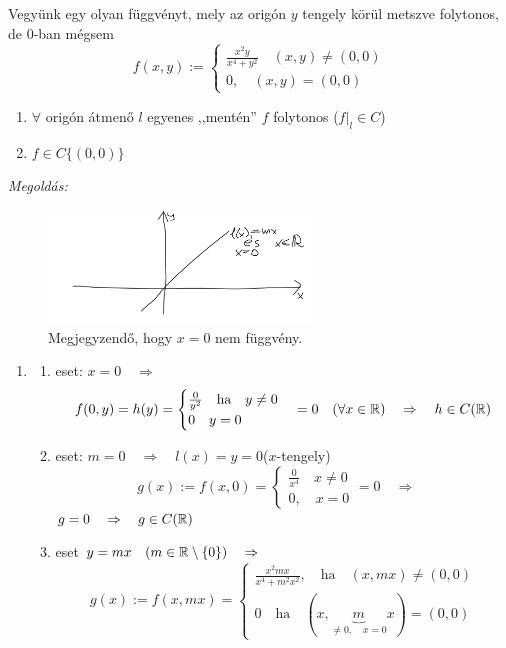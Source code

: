\documentclass[a4paper,11.5pt]{article}
\begin{document}
	\begin{task}
		Vegyünk egy olyan függvényt, mely az origón $y$ tengely körül metszve folytonos, de 0-ban mégsem
		\[ f(x,y):=\begin{cases}
			\frac{x^2y}{x^4+y^2}\quad (x,y)\not=(0,0)\\
			0,\quad (x,y)=(0,0)
		\end{cases} \]
		\begin{enumerate}
			\item $\forall$ origón átmenő $l$ egyenes ,,mentén'' $f$ folytonos ($f|_l\in C$)
			\item $f\in C\{ (0,0) \}$
		\end{enumerate}
		\textit{Megoldás:}
		\begin{figure}[H]
			\centering
			\includegraphics[height=3cm]{../2zh/kepek/26.png}
			\caption{Megjegyzendő, hogy $x=0$ nem függvény.}
		\end{figure}
		\begin{enumerate}
			\item\begin{enumerate}
				\item eset: $x=0\quad \Rightarrow\quad $
				\[ f(0,y)=h(y)=\begin{cases}
					\frac{0}{y^2}\quad \text{ha}\quad y\not=0\\
					0\quad y=0
				\end{cases}=0\quad (\forall x\in\mathbb{R})\quad \Rightarrow\quad h\in C(\mathbb{R}) \]
				\item eset: $m=0\quad \Rightarrow\quad l(x)=y=0$\quad ($x$-tengely)
				\[ g(x):=f(x,0)=\begin{cases}
					\frac{0}{x^4}\quad x\not=0\\
					0,\quad x=0
				\end{cases}=0\quad \Rightarrow\quad  \]
				$g=0\quad \Rightarrow\quad g\in C(\mathbb{R})$
				\item eset $y=mx\quad (m\in\mathbb{R}\setminus\{0\})\quad \Rightarrow$
				\[ g(x):=f(x,mx)=\begin{cases}
					\frac{x^2mx}{x^4+m^2x^2},\quad \text{ha}\quad (x,mx)\not=(0,0)\\
					0\quad \text{ha}\quad (x,\underbrace{m}_{\not=0,\quad x=0}x)=(0,0)

\end{cases}\]
\end{enumerate}
\end{enumerate}
\end{task}
\end{document}
